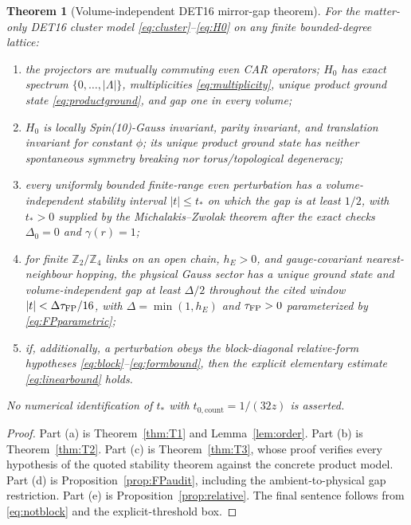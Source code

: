 \documentclass[11pt]{article}
\newtheorem{theorem}{Theorem}[section]
\theoremstyle{remark}
\begin{document}
\begin{theorem}[Volume-independent DET16 mirror-gap theorem]
\label{thm:main}
For the matter-only DET16 cluster model
\eqref{eq:cluster}--\eqref{eq:H0} on any finite bounded-degree lattice:
\begin{enumerate}[label=\textup{(\alph*)}]
\item the projectors are mutually commuting even CAR operators;
$H_0$ has exact spectrum $\{0,\ldots,|\Lambda|\}$, multiplicities
\eqref{eq:multiplicity}, unique product ground state
\eqref{eq:productground}, and gap one in every volume;
\item $H_0$ is locally Spin(10)-Gauss invariant, parity invariant, and
translation invariant for constant $\phi$; its unique product ground
state has neither spontaneous symmetry breaking nor torus/topological
degeneracy;
\item every uniformly bounded finite-range even perturbation has a
volume-independent stability interval $|t|\leq t_*$ on which the gap
is at least $1/2$, with $t_*>0$ supplied by the
Michalakis--Zwolak theorem after the exact checks
$\Delta_0=0$ and $\gamma(r)=1$;
\item for finite $\mathbb Z_2/\mathbb Z_4$ links on an open chain,
$h_E>0$, and gauge-covariant nearest-neighbour hopping, the physical
Gauss sector has a unique ground state and volume-independent gap at
least $\Delta/2$ throughout the cited window
$|t|<\Delta\tau_{\rm FP}/16$, with
$\Delta=\min(1,h_E)$ and $\tau_{\rm FP}>0$ parameterized by
\eqref{eq:FPparametric};
\item if, additionally, a perturbation obeys the block-diagonal
relative-form hypotheses \eqref{eq:block}--\eqref{eq:formbound}, then
the explicit elementary estimate \eqref{eq:linearbound} holds.
\end{enumerate}
No numerical identification of $t_*$ with
$t_{0,\mathrm{count}}=1/(32z)$ is asserted.
\end{theorem}

\begin{proof}
Part (a) is Theorem~\ref{thm:T1} and Lemma~\ref{lem:order}.
Part (b) is Theorem~\ref{thm:T2}.  Part (c) is
Theorem~\ref{thm:T3}, whose proof verifies every hypothesis of the
quoted stability theorem against the concrete product model.  Part
(d) is Proposition~\ref{prop:FPaudit}, including the ambient-to-physical
gap restriction.  Part (e) is Proposition~\ref{prop:relative}.  The
final sentence follows from \eqref{eq:notblock} and the
explicit-threshold box.
\end{proof}
\end{document}
